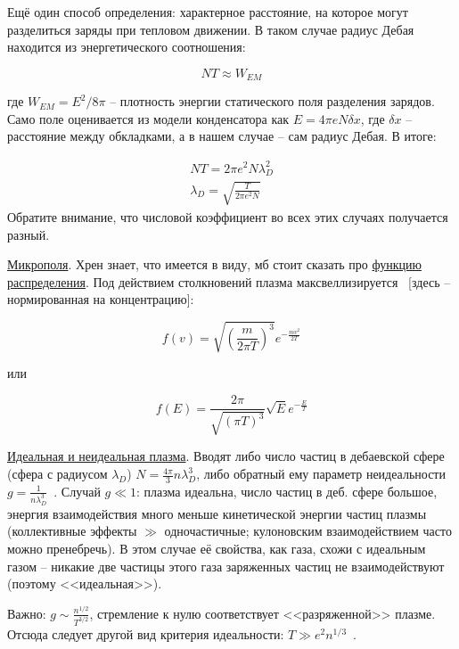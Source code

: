 \documentclass[10pt, a4paper]{article}
\numberwithin{equation}{section}
\begin{document}
\begin{itemize}
	Ещё один способ определения: характерное расстояние, на которое могут разделиться заряды при тепловом движении. В таком случае радиус Дебая находится из энергетического соотношения:
	
	\begin{equation*}
		NT \approx W_{EM}
	\end{equation*}

	где $W_{EM}=E^2/8\pi$ -- плотность энергии статического поля разделения зарядов. Само поле оценивается из модели конденсатора как $E=4\pi e N \delta x$, где $\delta x$ -- расстояние между обкладками, а в нашем случае -- сам радиус Дебая. В итоге:
	
	\begin{align*}
		NT = 2\pi e^2 N \lambda_D^2 \\
		\lambda_D = \sqrt{\frac{T}{2\pi e^2 N}}
	\end{align*}
	Обратите внимание, что числовой коэффициент во всех этих случаях получается разный.
\end{itemize}

\uline{Микрополя}. Хрен знает, что имеется в виду, мб стоит сказать про \uline{функцию распределения}. Под действием столкновений плазма максвеллизируется~\cite{kroll} [здесь -- нормированная на концентрацию]:

\begin{equation}
	f(v) = \sqrt{\left( \frac{m}{2\pi T}\right)^3} e^{-\frac{mv^2}{2T}}
\end{equation}

или

\begin{equation}
	f(E) = \frac{2\pi}{\sqrt{\left(\pi T\right)^3}}\sqrt{E} e^{-\frac{E}{T}}
\end{equation}

\uline{Идеальная и неидеальная плазма}. Вводят либо число частиц в дебаевской сфере (сфера с радиусом $\lambda_D$) $N = \frac{4\pi}{3}n\lambda_D^3$, либо обратный ему параметр неидеальности $g = \frac{1}{n\lambda_D^3}$~\cite{kroll}. Случай $g \ll 1$: плазма идеальна, число частиц в деб. сфере большое, энергия взаимодействия много меньше кинетической энергии частиц плазмы (коллективные эффекты $\gg$ одночастичные; кулоновским взаимодействием часто можно пренебречь). В этом случае её свойства, как газа, схожи с идеальным газом -- никакие две частицы этого газа заряженных частиц не взаимодействуют (поэтому <<идеальная>>).

Важно: $g \sim \frac{n^{1/2}}{T^{3/2}}$, стремление к нулю соответствует <<разряженной>> плазме. Отсюда следует другой вид критерия идеальности: $T \gg e^2 n^{1/3}$~\cite{kotelnikov}.
\end{document}
